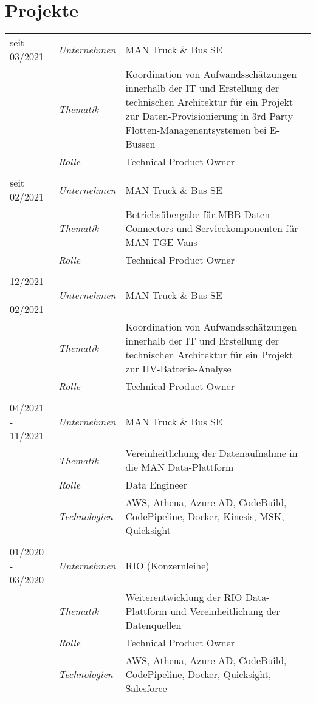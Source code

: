\section*{Projekte}
\renewcommand{\arraystretch}{1.3}
\begin{longtable}{@{}>{}p{4cm}>{\itshape}p{2cm}>{}p{9cm}}
seit 03/2021 & Unternehmen   & MAN Truck \& Bus SE\\
\nopagebreak		& Thematik	    & Koordination von Aufwandsschätzungen innerhalb der IT und Erstellung der technischen Architektur für ein Projekt zur Daten-Provisionierung in 3rd Party Flotten-Managenentsystemen bei E-Bussen\\
\nopagebreak		& Rolle 	      & Technical Product Owner\\
\\
seit 02/2021 & Unternehmen   & MAN Truck \& Bus SE\\
\nopagebreak		& Thematik	    & Betriebsübergabe für MBB Daten-Connectors und Servicekomponenten für MAN TGE Vans \\
\nopagebreak		& Rolle 	      & Technical Product Owner\\
\\
12/2021 - 02/2021 & Unternehmen   & MAN Truck \& Bus SE\\
\nopagebreak		& Thematik	    & Koordination von Aufwandsschätzungen innerhalb der IT und Erstellung der technischen Architektur für ein Projekt zur HV-Batterie-Analyse\\
\nopagebreak		& Rolle 	      & Technical Product Owner\\
\\
04/2021 - 11/2021 & Unternehmen   & MAN Truck \& Bus SE\\
\nopagebreak		& Thematik	    & Vereinheitlichung der Datenaufnahme in die MAN Data-Plattform\\
\nopagebreak		& Rolle 	      & Data Engineer\\
\nopagebreak		& Technologien	& AWS, Athena, Azure AD, CodeBuild, CodePipeline, Docker, Kinesis, MSK, Quicksight\\
\\
01/2020 - 03/2020 & Unternehmen   & RIO (Konzernleihe)\\
\nopagebreak		& Thematik	    & Weiterentwicklung der RIO Data-Plattform und Vereinheitlichung der Datenquellen\\
\nopagebreak		& Rolle 	      & Technical Product Owner\\
\nopagebreak		& Technologien	& AWS, Athena, Azure AD, CodeBuild, CodePipeline, Docker, Quicksight, Salesforce\\

\end{longtable}
